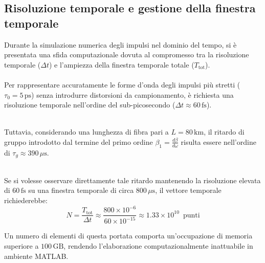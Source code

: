 \subsection{Risoluzione temporale e gestione della finestra temporale}
Durante la simulazione numerica degli impulsi nel dominio del tempo, si è presentata una sfida computazionale dovuta al compromesso tra la risoluzione temporale ($\Delta t$)
e l'ampiezza della finestra temporale totale ($T_{\text{tot}}$).
\noindent\\ \\Per rappresentare accuratamente le forme d'onda degli impulsi più stretti ($\tau_0 = 5\,\text{ps}$) senza introdurre distorsioni da campionamento, è
richiesta una risoluzione temporale nell'ordine del sub-picosecondo ($\Delta t \approx 60\,\text{fs}$).

\noindent\\ Tuttavia, considerando una lunghezza di fibra pari a $L = 80\,\text{km}$, il ritardo di gruppo introdotto dal termine del primo ordine
$\beta_1 = \frac{d\beta}{d\omega}$ risulta essere nell'ordine di $\tau_g \approx 390\,\mu\text{s}$. 

\noindent\\ Se si volesse osservare direttamente tale ritardo mantenendo la risoluzione elevata di $60\,\text{fs}$ su una finestra temporale di circa $800\,\mu\text{s}$, il vettore temporale richiederebbe:
\begin{equation}
    N = \frac{T_{\text{tot}}}{\Delta t} \approx \frac{800 \times 10^{-6}}{60 \times 10^{-15}} \approx 1.33 \times 10^{10} \,\,\, \text{punti}
\end{equation}

\noindent Un numero di elementi di questa portata comporta un'occupazione di memoria superiore a $100\,\text{GB}$, rendendo l'elaborazione computazionalmente inattuabile in ambiente MATLAB.

